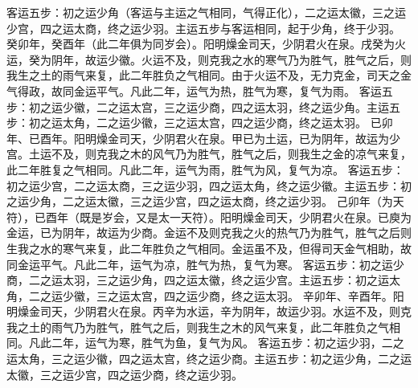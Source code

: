 \documentclass[a4paper,12pt,UTF8,twoside]{ctexbook}
\begin{document}
客运五步：初之运少角（客运与主运之气相同，气得正化），二之运太徽，三之运少宫，四之运太商，终之运少羽。主运五步与客运相同，起于少角，终于少羽。
癸卯年，癸酉年（此二年俱为同岁会）。阳明燥金司天，少阴君火在泉。戌癸为火运，癸为阴年，故运少徽。火运不及，则克我之水的寒气乃为胜气，胜气之后，则我生之土的雨气来复，此二年胜负之气相同。由于火运不及，无力克金，司天之金气得政，故同金运平气。凡此二年，运气为热，胜气为寒，复气为雨。
客运五步：初之运少徽，二之运太宫，三之运少商，四之运太羽，终之运少角。主运五步：初之运太角，二之运少徽，三之运太宫，四之运少商，终之运太羽。
已卯年、已酉年。阳明燥金司天，少阴君火在泉。甲已为土运，已为阴年，故运为少宫。土运不及，则克我之木的风气乃为胜气，胜气之后，则我生之金的凉气来复，此二年胜复之气相同。凡此二年，运气为雨，胜气为风，复气为凉。
客运五步：初之运少宫，二之运太商，三之运少羽，四之运太角，终之运少徽。主运五步：初之运少角，二之运太徽，三之运少宫，四之运太商，终之运少羽。
己卯年（为天符），已酉年（既是岁会，又是太一天符）。阳明燥金司天，少阴君火在泉。已庾为金运，已为阴年，故运为少商。金运不及则克我之火的热气乃为胜气，胜气之后则生我之水的寒气来复，此二年胜负之气相同。金运虽不及，但得司天金气相助，故同金运平气。凡此二年，运气为凉，胜气为热，复气为寒。
客运五步：初之运少商，二之运太羽，三之运少角，四之运太徽，终之运少宫。主运五步：初之运太角，二之运少徽，三之运太宫，四之运少商，终之运太羽。
辛卯年、辛酉年。阳明燥金司天，少阴君火在泉。丙辛为水运，辛为阴年，故运少羽。水运不及，则克我之土的雨气乃为胜气，胜气之后，则我生之木的风气来复，此二年胜负之气相同。凡此二年，运气为寒，胜气为鱼，复气为风。
客运五步：初之运少羽，二之运太角，三之运少徽，四之运太宫，终之运少商。主运五步：初之运少角，二之运太徽，三之运少宫，四之运少商，终之运少羽。
\end{document}
